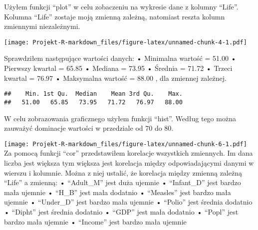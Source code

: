 \documentclass[
]{article}
\newenvironment{Shaded}{\begin{snugshade}}{\end{snugshade}}
\newcommand{\FunctionTok}[1]{\textcolor[rgb]{0.00,0.00,0.00}{#1}}
\newcommand{\NormalTok}[1]{#1}
\newcommand{\SpecialCharTok}[1]{\textcolor[rgb]{0.00,0.00,0.00}{#1}}
\newcommand{\StringTok}[1]{\textcolor[rgb]{0.31,0.60,0.02}{#1}}
\begin{document}
Użyłem funkcji ``plot'' w celu zobaczeniu na wykresie dane z kolumny
``Life''. Kolumna ``Life'' zostaje moją zmienną zależną, natomiast
reszta kolumn zmiennymi niezależnymi.

\begin{Shaded}
\end{Shaded}

\texttt{[image: Projekt-R-markdown\_files/figure-latex/unnamed-chunk-4-1.pdf]}

Sprawdziłem następujące wartości danych: • Minimalna wartość = 51.00 •
Pierwszy kwartal = 65.85 • Mediana = 73.95 • Średnia = 71.72 • Trzeci
kwartal = 76.97 • Maksymalna wartość = 88.00 , dla zmiennej zależnej.

\begin{Shaded}
\end{Shaded}

\begin{verbatim}
##    Min. 1st Qu.  Median    Mean 3rd Qu.    Max. 
##   51.00   65.85   73.95   71.72   76.97   88.00
\end{verbatim}

W celu zobrazowania graficznego użyłem funkcji ``hist''. Według tego
można zauważyć dominacje wartości w przedziale od 70 do 80.

\begin{Shaded}
\end{Shaded}

\texttt{[image: Projekt-R-markdown\_files/figure-latex/unnamed-chunk-6-1.pdf]}
Za pomocą funkcji ``cor'' przedstawiłem korelacje wszystkich zmiennych.
Im dana liczba jest większa tym większa jest korelacja między
odpowiadającymi danymi w wierszu i kolumnie. Można z niej ustalić, że
korelacja między zmienną zależną ``Life'' a zmienną: • ``Adult\_M'' jest
duża ujemnie • ``Infant\_D'' jest bardzo mała ujemnie • ``H\_B'' jest
mała dodatnio • ``Measles'' jest bardzo mała ujemnie • ``Under\_D'' jest
bardzo mała ujemnie • ``Polio'' jest średnia dodatnio • ``Dipht'' jest
średnia dodatnio • ``GDP'' jest mała dodatnio • ``Popl'' jest bardzo
mała ujemnie • ``Income'' jest bardzo mała ujemnie
\end{document}
